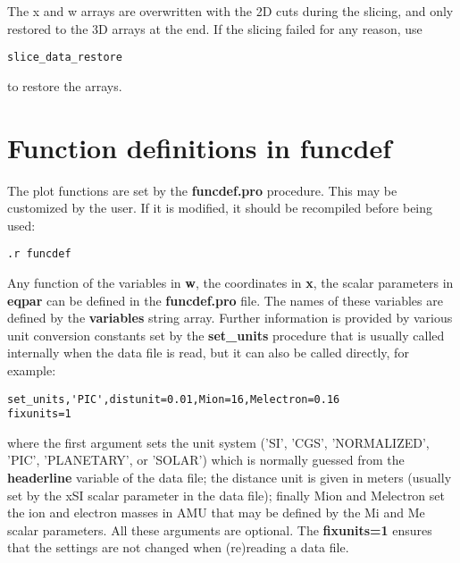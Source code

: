 \documentclass{article}
\begin{document}
The x and w arrays are overwritten with the 2D cuts during the slicing,
and only restored to the 3D arrays at the end.
If the slicing failed for any reason, use
\begin{verbatim}
slice_data_restore
\end{verbatim}
to restore the arrays.

\section{Function definitions in funcdef \label{s-funcdef}}

The plot functions are set by the {\bf funcdef.pro} procedure.
This may be customized by the user. If it is modified, 
it should be recompiled before being used:
\begin{verbatim}
.r funcdef
\end{verbatim}
Any function of the variables in {\bf w}, the coordinates in
{\bf x}, the scalar parameters in {\bf eqpar} can be defined in the 
{\bf funcdef.pro} file. The names of these variables are defined
by the {\bf variables} string array.
Further information is provided by various
unit conversion constants set by the {\bf set\_units} procedure that
is usually called internally when the data file is read, 
but it can also be called directly, for example:
\begin{verbatim}
set_units,'PIC',distunit=0.01,Mion=16,Melectron=0.16
fixunits=1
\end{verbatim}
where the first argument sets the unit system
('SI', 'CGS', 'NORMALIZED', 'PIC', 'PLANETARY', or 'SOLAR')
which is normally guessed from the {\bf headerline} variable
of the data file;
the distance unit is given in meters (usually set by the xSI
scalar parameter in the data file); finally 
Mion and Melectron set the ion and electron masses in AMU
that may be defined by the Mi and Me scalar parameters.
All these arguments are optional.
The {\bf fixunits=1} ensures that the settings are not changed
when (re)reading a data file.
\end{document}
